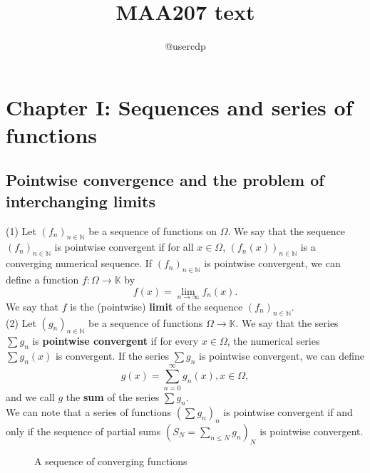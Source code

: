 \documentclass{article}
\title{MAA207 text}
\author{@usercdp}
\date{}
\newcounter{defcount}[subsection] %
\newcommand{\defbox}{\thesubsection.\arabic{defcount}}
\newcommand{\definition}[2]{ %
    \stepcounter{defcount}
    \begin{tcolorbox}[
        colback=green!10!white, %
        colframe=green!70!blue!30!white, %
        coltitle=black, %
        fonttitle=\bfseries, %
        title={{Definition \defbox: #1}}, %
        enhanced, %
        boxed title style={
            colback=cyan!60!black, %
            outer arc=0pt, %
            arc=0pt, %
        },
        before upper={\noindent}, %
    ]
    #2 %
    \end{tcolorbox}
}
\begin{document}
\maketitle

\section{Chapter I: Sequences and series of functions}

\subsection{Pointwise convergence and the problem of interchanging limits}

\definition{Pointwise convergence}{
(1) Let $(f_n)_{n\in\mathbb{N}}$ be a sequence of functions on $\Omega$. We say that the sequence $(f_n)_{n\in\mathbb{N}}$ is pointwise convergent if for all $x\in\Omega$, $(f_n(x))_{n\in\mathbb{N}}$ is a converging numerical sequence. If $(f_n)_{n\in\mathbb{N}}$ is pointwise convergent, we can define a function $f:\Omega\rightarrow\mathbb{K}$ by $$f(x)=\displaystyle\lim_{n\rightarrow\infty}f_n(x).$$ We say that $f$ is the (pointwise) \textbf{limit} of the sequence $(f_n)_{n\in\mathbb{N}}.$
\\

(2) Let $(g_n)_{n\in\mathbb{N}}$ be a sequence of functions $\Omega\rightarrow\mathbb{K}$. We say that the series $\sum g_n$ is \textbf{pointwise convergent} if for every $x\in\Omega$, the numerical series $\sum g_n(x)$ is convergent. If the series $\sum g_n$ is pointwise convergent, we can define $$g(x)=\displaystyle\sum_{n=0}^\infty g_n(x), x\in\Omega,$$ and we call $g$ the \textbf{sum} of the series $\sum g_n.$
\\

We can note that a series of functions $(\sum g_n)_n$ is pointwise convergent if and only if the sequence of partial sums $(S_N=\sum_{n\leq N}g_n)_N$ is pointwise convergent.
}

\vspace{-10pt}

\begin{figure}[htbp]
    \centering
  \scalebox{0.45}{}
  \vspace{-16pt}
  \caption{A sequence of converging functions}
  \label{fig:example}
\end{figure}

\vspace{-10pt}
\end{document}
